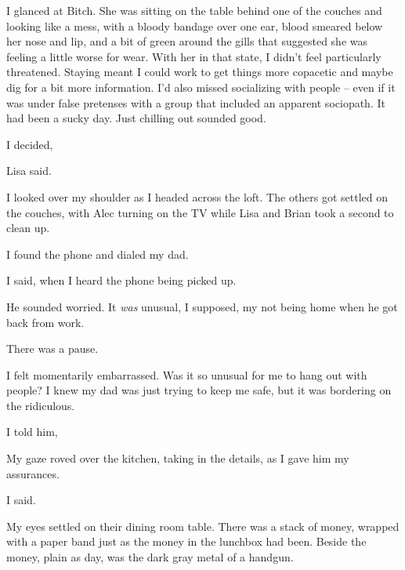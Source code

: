 I glanced at Bitch. She was sitting on the table behind one of the couches and looking like a mess, with a bloody bandage over one ear, blood smeared below her nose and lip, and a bit of green around the gills that suggested she was feeling a little worse for wear. With her in that state, I didn't feel particularly threatened. Staying meant I could work to get things more copacetic and maybe dig for a bit more information. I'd also missed socializing with people -- even if it was under false pretenses with a group that included an apparent sociopath. It had been a sucky day. Just chilling out sounded good.

 I decided, 

 Lisa said.

I looked over my shoulder as I headed across the loft. The others got settled on the couches, with Alec turning on the TV while Lisa and Brian took a second to clean up.

I found the phone and dialed my dad.

 I said, when I heard the phone being picked up.

 He sounded worried. It {\em was} unusual, I supposed, my not being home when he got back from work.


There was a pause.


I felt momentarily embarrassed. Was it so unusual for me to hang out with people? I knew my dad was just trying to keep me safe, but it was bordering on the ridiculous.

 I told him, 


My gaze roved over the kitchen, taking in the details, as I gave him my assurances.

 I said.

My eyes settled on their dining room table. There was a stack of money, wrapped with a paper band just as the money in the lunchbox had been. Beside the money, plain as day, was the dark gray metal of a handgun.

